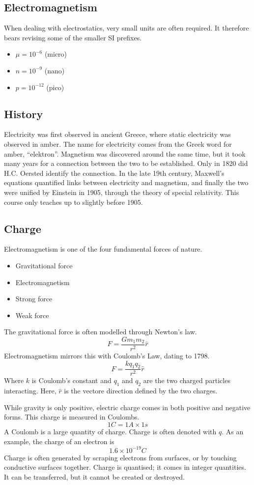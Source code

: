 \documentclass[12pt]{report}
\begin{document}
\begin{flushleft}

\section*{Electromagnetism}

When dealing with electrostatics, very small units are often required.
It therefore bears revising some of the smaller SI prefixes.
\begin{itemize}
    \item \(\mu = 10^{-6}\) (micro)
    \item \(n = 10^{-9}\) (nano)
    \item \(p = 10^{-12}\) (pico)
\end{itemize}

\subsection*{History}
Electricity was first observed in ancient Greece, where static electricity was
observed in amber. The name for electricity comes from the Greek word for 
amber, ``elektron''. Magnetism was discovered around the same time, but it took
many years for a connection between the two to be established. Only in 1820 did
H.C. Oersted identify the connection. In the late 19th century, Maxwell's 
equations quantified links between electricity and magnetism, and finally the
two were unified by Einstein in 1905, through the theory of special relativity.
This course only teaches up to slightly before 1905.

\subsection*{Charge}
Electromagnetism is one of the four fundamental forces of nature.
\begin{itemize}
    \item Gravitational force
    \item Electromagnetism
    \item Strong force
    \item Weak force
\end{itemize}
The gravitational force is often modelled through Newton's law.
\[F = \frac{Gm_1m_2}{r^2}\hat{r}\]
Electromagnetism mirrors this with Coulomb's Law, dating to 1798.
\[F = \frac{kq_1q_2}{r^2}\hat{r}\]
Where \(k\) is Coulomb's constant and \(q_1\) and \(q_2\) are the two charged
particles interacting. Here, \(\hat{r}\) is the vectore direction defined by
the two charges. \par
While gravity is only positive, electric charge comes in both positive and
negative forms. This charge is measured in Coulombs.
\[1C = 1A \times 1s\]
A Coulomb is a large quantity of charge. Charge is often denoted with \(q\).
As an example, the charge of an electron is
\[1.6 \times 10^{-19}C\]
Charge is often generated by scraping electrons from surfaces, or by touching
conductive surfaces together. 
Charge is quantised; it comes in integer quantities. It can be transferred, but
it cannot be created or destroyed.


\end{flushleft}
\end{document}
